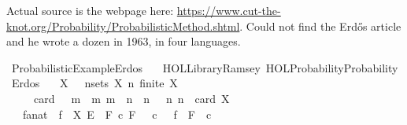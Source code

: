 %
\begin{isabellebody}%
%
%
\isadelimdocument
%
\endisadelimdocument
%
\isatagdocument
%
\isamarkuptrue%
%
\endisatagdocument
{\isafolddocument}%
%
\isadelimdocument
%
\endisadelimdocument
%
\begin{isamarkuptext}%
Actual source is the webpage here: \url{https://www.cut-the-knot.org/Probability/ProbabilisticMethod.shtml}.
Could not find the Erdős article and he wrote a dozen in 1963, in four languages.%
\end{isamarkuptext}\isamarkuptrue%
%
\isadelimtheory
%
\endisadelimtheory
%
\isatagtheory
{}\isamarkupfalse%
\ Probabilistic{\isacharunderscore}{\kern0pt}Example{\isacharunderscore}{\kern0pt}Erdos\isanewline
\ \ \ {\isachardoublequoteopen}HOL{\isacharminus}{\kern0pt}Library{\isachardot}{\kern0pt}Ramsey{\isachardoublequoteclose}\ {\isachardoublequoteopen}HOL{\isacharminus}{\kern0pt}Probability{\isachardot}{\kern0pt}Probability{\isachardoublequoteclose}\isanewline
\isanewline
{}%
\endisatagtheory
{\isafoldtheory}%
%
\isadelimtheory
%
\endisadelimtheory
\isanewline
\isanewline
{}\isamarkupfalse%
\ Erdos{\isacharunderscore}{\kern0pt}{}{}{}{}{\isacharcolon}{\kern0pt}\isanewline
\ \ \ X{\isacharcolon}{\kern0pt}\ {\isachardoublequoteopen}{\isasymF}\ {\isasymsubseteq}\ nsets\ X\ n{\isachardoublequoteclose}\ {\isachardoublequoteopen}finite\ X{\isachardoublequoteclose}\isanewline
\ \ \ \ \ {\isachardoublequoteopen}card\ {\isasymF}\ {\isacharequal}{\kern0pt}\ m{\isachardoublequoteclose}\ \ m{\isacharcolon}{\kern0pt}\ {\isachardoublequoteopen}m\ {\isacharless}{\kern0pt}\ {}{\isacharcircum}{\kern0pt}{\isacharparenleft}{\kern0pt}n{\isacharminus}{\kern0pt}{}{\isacharparenright}{\kern0pt}{\isachardoublequoteclose}\ \ n{\isacharcolon}{\kern0pt}\ {\isachardoublequoteopen}{}\ {\isacharless}{\kern0pt}\ n{\isachardoublequoteclose}\ {\isachardoublequoteopen}n\ {\isasymle}\ card\ X{\isachardoublequoteclose}\isanewline
\ \ \ f{\isacharcolon}{\kern0pt}{\isacharcolon}{\kern0pt}{\isachardoublequoteopen}{\isacharprime}{\kern0pt}a{\isasymRightarrow}nat{\isachardoublequoteclose}\ \ {\isachardoublequoteopen}f\ {\isasymin}\ X\ {\isasymrightarrow}\isactrlsub E\ {\isacharbraceleft}{\kern0pt}{\isachardot}{\kern0pt}{\isachardot}{\kern0pt}{\isacharless}{\kern0pt}{}{\isacharbraceright}{\kern0pt}{\isachardoublequoteclose}\ {\isachardoublequoteopen}{\isasymAnd}F\ c{\isachardot}{\kern0pt}\ {\isasymlbrakk}F\ {\isasymin}\ {\isasymF}{\isacharsemicolon}{\kern0pt}\ c{\isacharless}{\kern0pt}{}{\isasymrbrakk}\ {\isasymLongrightarrow}\ {\isasymnot}\ f\ {\isacharbackquote}{\kern0pt}\ F\ {\isasymsubseteq}\ {\isacharbraceleft}{\kern0pt}c{\isacharbraceright}{\kern0pt}{\isachardoublequoteclose}\isanewline

\end{isabellebody}
